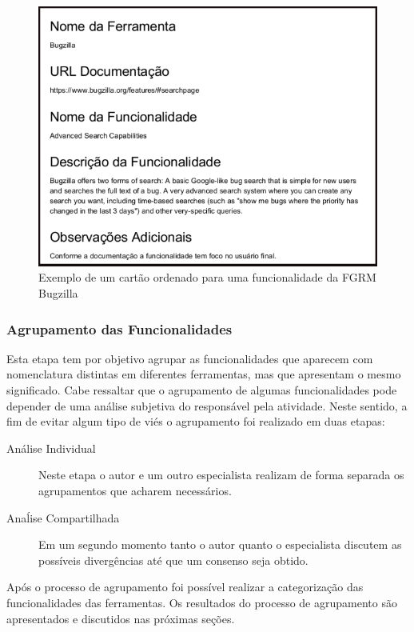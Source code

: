 \begin{figure}[htpb]
	\centering
	\includegraphics[width=0.8\linewidth]{./chapter-estudo-funcionalidades-fgrm/img/exemplo_cartao_ordenado.png}
	\caption{Exemplo de um cartão ordenado para uma funcionalidade da FGRM
		Bugzilla}
\label{fig:exemplo_cartao_ordenado}
\end{figure}
\todoend{}

\subsubsection{Agrupamento das Funcionalidades}
\label{subsec:agrupamento_fucionalidades}

Esta etapa tem por objetivo agrupar as funcionalidades que aparecem com
nomenclatura distintas em diferentes ferramentas, mas que apresentam o mesmo
significado. Cabe ressaltar que o agrupamento de algumas funcionalidades pode
depender de uma análise subjetiva do responsável pela atividade. Neste sentido,
a fim de evitar algum tipo de viés o agrupamento foi realizado em duas etapas:

\begin{description}
	\item[Análise Individual] Neste etapa o autor e um outro especialista
		realizam de forma separada os agrupamentos que acharem necessários.
	\item[Anaĺise Compartilhada] Em um segundo momento tanto o autor quanto o
		es\-pe\-ci\-a\-lis\-ta discutem as possíveis divergências até que um
		consenso seja obtido.
\end{description}

Após o processo de agrupamento foi possível realizar a categorização das
funcionalidades das ferramentas. Os resultados do processo de agrupamento são
apresentados e discutidos nas próximas seções.

